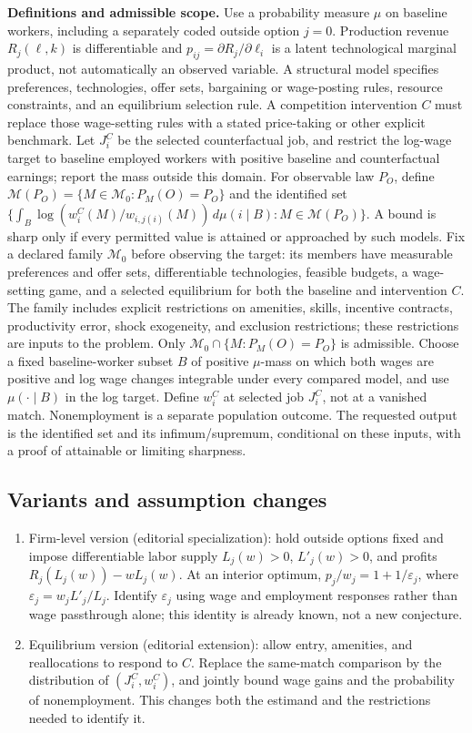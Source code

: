 \documentclass[11pt,a4paper]{article}
\begin{document}
\textbf{Definitions and admissible scope.} Use a probability measure \(\mu\) on baseline workers, including a separately coded outside option \(j=0\). Production revenue \(R_j(\ell,k)\) is differentiable and \(p_{ij}=\partial R_j/\partial\ell_i\) is a latent technological marginal product, not automatically an observed variable. A structural model specifies preferences, technologies, offer sets, bargaining or wage-posting rules, resource constraints, and an equilibrium selection rule. A competition intervention \(C\) must replace those wage-setting rules with a stated price-taking or other explicit benchmark. Let \(J_i^C\) be the selected counterfactual job, and restrict the log-wage target to baseline employed workers with positive baseline and counterfactual earnings; report the mass outside this domain. For observable law \(P_O\), define \(\mathcal M(P_O)=\{M\in\mathcal M_0:P_M(O)=P_O\}\) and the identified set \(\{\int_B\log(w_i^C(M)/w_{i,j(i)}(M))\,d\mu(i\mid B):M\in\mathcal M(P_O)\}\). A bound is sharp only if every permitted value is attained or approached by such models. Fix a declared family \(\mathcal M_0\) before observing the target: its members have measurable preferences and offer sets, differentiable technologies, feasible budgets, a wage-setting game, and a selected equilibrium for both the baseline and intervention \(C\). The family includes explicit restrictions on amenities, skills, incentive contracts, productivity error, shock exogeneity, and exclusion restrictions; these restrictions are inputs to the problem. Only \(\mathcal M_0\cap\{M:P_M(O)=P_O\}\) is admissible. Choose a fixed baseline-worker subset \(B\) of positive \(\mu\)-mass on which both wages are positive and log wage changes integrable under every compared model, and use \(\mu(\cdot\mid B)\) in the log target. Define \(w_i^C\) at selected job \(J_i^C\), not at a vanished match. Nonemployment is a separate population outcome. The requested output is the identified set and its infimum/supremum, conditional on these inputs, with a proof of attainable or limiting sharpness.
\subsection*{Variants and assumption changes}
\begin{enumerate}
\item Firm-level version (editorial specialization): hold outside options fixed and impose differentiable labor supply \(L_j(w)>0\), \(L'_j(w)>0\), and profits \(R_j(L_j(w))-wL_j(w)\). At an interior optimum, \(p_j/w_j=1+1/\varepsilon_j\), where \(\varepsilon_j=w_jL'_j/L_j\). Identify \(\varepsilon_j\) using wage and employment responses rather than wage passthrough alone; this identity is already known, not a new conjecture.
\item Equilibrium version (editorial extension): allow entry, amenities, and reallocations to respond to \(C\). Replace the same-match comparison by the distribution of \((J_i^C,w_i^C)\), and jointly bound wage gains and the probability of nonemployment. This changes both the estimand and the restrictions needed to identify it.
\end{enumerate}
\end{document}
